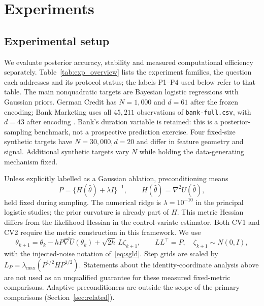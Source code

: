 \section{Experiments}\label{sec:experiments}
\subsection{Experimental setup}\label{sec:exp_setup}
We evaluate posterior accuracy, stability and measured computational efficiency separately. Table~\ref{tab:exp_overview} lists the experiment families, the question each addresses and its protocol status; the labels P1--P4 used below refer to that table. The main nonquadratic targets are Bayesian logistic regressions with Gaussian priors. German Credit has $N=1{,}000$ and $d=61$ after the frozen encoding; Bank Marketing uses all $45{,}211$ observations of \texttt{bank-full.csv}, with $d=43$ after encoding \citep{hofmann1994german,moro2014bank}. Bank's duration variable is retained: this is a posterior-sampling benchmark, not a prospective prediction exercise. Four fixed-size synthetic targets have $N=30{,}000,d=20$ and differ in feature geometry and signal. Additional synthetic targets vary $N$ while holding the data-generating mechanism fixed.


Unless explicitly labelled as a Gaussian ablation, preconditioning means
\begin{equation}\label{eq:exp_metric}
 P=\{H(\hat\theta)+\lambda I\}^{-1},\qquad H(\hat\theta)=\nabla^2U(\hat\theta),
\end{equation}
held fixed during sampling. The numerical ridge is $\lambda=10^{-10}$ in the principal logistic studies; the prior curvature is already part of $H$. This metric Hessian differs from the likelihood Hessian in the control-variate estimator. Both CV1 and CV2 require the metric construction in this framework. We use
\begin{equation}\label{eq:exp_update}
 \theta_{k+1}=\theta_k-hP\widehat{\nabla U}(\theta_k)+\sqrt{2h}\,L\zeta_{k+1},
 \qquad LL^\top=P,\quad\zeta_{k+1}\sim N(0,I),
\end{equation}
with the injected-noise notation of~\eqref{eq:sgld}. Step grids are scaled by $L_P=\lambda_{\max}(P^{1/2}HP^{1/2})$. Statements about the identity-coordinate analysis above are not used as an unqualified guarantee for these measured fixed-metric comparisons. Adaptive preconditioners are outside the scope of the primary comparisons (Section~\ref{sec:related}).


